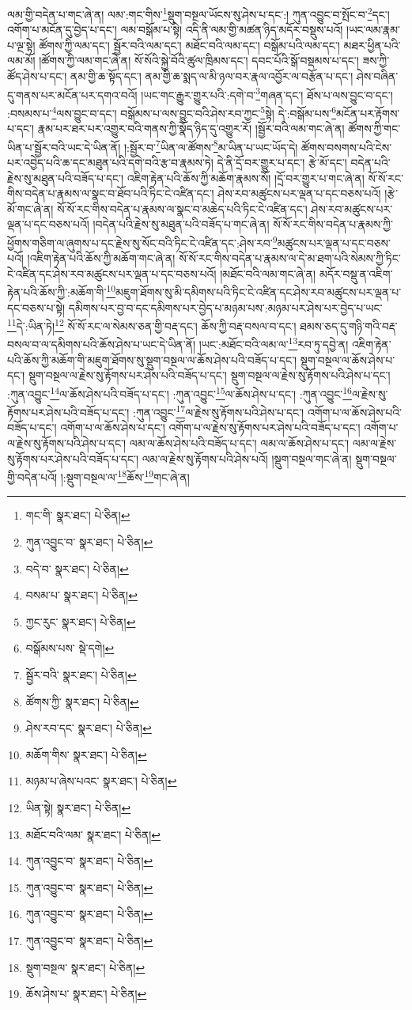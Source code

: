 ལམ་གྱི་བདེན་པ་གང་ཞེ་ན། ལམ་:གང་གིས་\footnote{གང་གི་  སྣར་ཐང་།  པེ་ཅིན། }སྡུག་བསྔལ་ཡོངས་སུ་ཤེས་པ་དང་:། ཀུན་འབྱུང་བ་སྤོང་བ་\footnote{ཀུན་འབྱུང་བ་  སྣར་ཐང་།  པེ་ཅིན། }དང་། འགོག་པ་མངོན་དུ་བྱེད་པ་དང་། ལམ་བསྒོམ་པ་སྟེ། འདི་ནི་ལམ་གྱི་མཚན་ཉིད་མདོར་བསྡུས་པའོ། །ཡང་ལམ་རྣམ་པ་ལྔ་སྟེ། ཚོགས་ཀྱི་ལམ་དང་། སྦྱོར་བའི་ལམ་དང་། མཐོང་བའི་ལམ་དང་། བསྒོམ་པའི་ལམ་དང་། མཐར་ཕྱིན་པའི་ལམ་མོ། །ཚོགས་ཀྱི་ལམ་གང་ཞེ་ན། སོ་སོའི་སྐྱེ་བོའི་ཚུལ་ཁྲིམས་དང་། དབང་པོའི་སྒོ་བསྡམས་པ་དང་། ཟས་ཀྱི་ཚོད་ཤེས་པ་དང་། ནམ་གྱི་ཆ་སྟོད་དང་། ནམ་གྱི་ཆ་སྨད་ལ་མི་ཉལ་བར་རྣལ་འབྱོར་ལ་བརྩོན་པ་དང་། ཤེས་བཞིན་དུ་གནས་པར་མངོན་པར་དགའ་བའོ། །ཡང་གང་རྒྱུར་གྱུར་པའི་:དགེ་བ་\footnote{བདེ་བ་  སྣར་ཐང་།  པེ་ཅིན། }གཞན་དང་། ཐོས་པ་ལས་བྱུང་བ་དང་། :བསམས་པ་\footnote{བསམ་པ་  སྣར་ཐང་།  པེ་ཅིན། }ལས་བྱུང་བ་དང་། བསྒོམས་པ་ལས་བྱུང་བའི་ཤེས་རབ་ཀྱང་\footnote{ཀྱང་རུང་  སྣར་ཐང་།  པེ་ཅིན། }སྟེ། དེ་:བསྒོམ་པས་\footnote{བསྒོམས་པས་  སྡེ་དགེ། }མངོན་པར་རྟོགས་པ་དང་། རྣམ་པར་ཐར་པར་འགྱུར་བའི་གནས་ཀྱི་སྣོད་ཉིད་དུ་འགྱུར་རོ། །སྦྱོར་བའི་ལམ་གང་ཞེ་ན། ཚོགས་ཀྱི་གང་ཡིན་པ་སྦྱོར་བའི་ཡང་དེ་ཡིན་ནོ། །:སྦྱོར་བ་\footnote{སྦྱོར་བའི་  སྣར་ཐང་།  པེ་ཅིན། }ཡིན་ལ་ཚོགས་\footnote{ཚོགས་ཀྱི་  སྣར་ཐང་།  པེ་ཅིན། }མ་ཡིན་པ་ཡང་ཡོད་དེ། ཚོགས་བསགས་པའི་ངེས་པར་འབྱེད་པའི་ཆ་དང་མཐུན་པའི་དགེ་བའི་རྩ་བ་རྣམས་ཏེ། དེ་ནི་དྲོ་བར་གྱུར་པ་དང་། རྩེ་མོ་དང་། བདེན་པའི་རྗེས་སུ་མཐུན་པའི་བཟོད་པ་དང་། འཇིག་རྟེན་པའི་ཆོས་ཀྱི་མཆོག་རྣམས་སོ། །དྲོ་བར་གྱུར་པ་གང་ཞེ་ན། སོ་སོ་རང་གིས་བདེན་པ་རྣམས་ལ་སྣང་བ་ཐོབ་པའི་ཏིང་ངེ་འཛིན་དང་། ཤེས་རབ་མཚུངས་པར་ལྡན་པ་དང་བཅས་པའོ། །རྩེ་མོ་གང་ཞེ་ན། སོ་སོ་རང་གིས་བདེན་པ་རྣམས་ལ་སྣང་བ་མཆེད་པའི་ཏིང་ངེ་འཛིན་དང་། ཤེས་རབ་མཚུངས་པར་ལྡན་པ་དང་བཅས་པའོ། །བདེན་པའི་རྗེས་སུ་མཐུན་པའི་བཟོད་པ་གང་ཞེ་ན། སོ་སོ་རང་གིས་བདེན་པ་རྣམས་ཀྱི་ཕྱོགས་གཅིག་ལ་ཞུགས་པ་དང་རྗེས་སུ་སོང་བའི་ཏིང་ངེ་འཛིན་དང་:ཤེས་རབ་\footnote{ཤེས་རབ་དང་  སྣར་ཐང་།  པེ་ཅིན། }མཚུངས་པར་ལྡན་པ་དང་བཅས་པའོ། །འཇིག་རྟེན་པའི་ཆོས་ཀྱི་མཆོག་གང་ཞེ་ན། སོ་སོ་རང་གིས་བདེན་པ་རྣམས་ལ་དེ་མ་ཐག་པའི་སེམས་ཀྱི་ཏིང་ངེ་འཛིན་དང་ཤེས་རབ་མཚུངས་པར་ལྡན་པ་དང་བཅས་པའོ། །མཐོང་བའི་ལམ་གང་ཞེ་ན། མདོར་བསྡུ་ན་འཇིག་རྟེན་པའི་ཆོས་ཀྱི་:མཆོག་གི་\footnote{མཆོག་གིས་  སྣར་ཐང་།  པེ་ཅིན། }མཇུག་ཐོགས་སུ་མི་དམིགས་པའི་ཏིང་ངེ་འཛིན་དང་ཤེས་རབ་མཚུངས་པར་ལྡན་པ་དང་བཅས་པ་སྟེ། དམིགས་པར་བྱ་བ་དང་དམིགས་པར་བྱེད་པ་མཉམ་པས་:མཉམ་པར་ཤེས་པར་བྱེད་པ་ཡང་\footnote{མཉམ་པ་ཞེས་པའང་  སྣར་ཐང་།  པེ་ཅིན། }དེ་:ཡིན་ཏེ།\footnote{ཡིན་སྟེ།  སྣར་ཐང་།  པེ་ཅིན། } སོ་སོ་རང་ལ་སེམས་ཅན་གྱི་བརྡ་དང་། ཆོས་ཀྱི་བརྡ་བསལ་བ་དང་། ཐམས་ཅད་དུ་གཉི་གའི་བརྡ་བསལ་བ་ལ་དམིགས་པའི་ཆོས་ཤེས་པ་ཡང་དེ་ཡིན་ནོ། །ཡང་:མཐོང་བའི་ལམ་ལ་\footnote{མཐོང་བའི་ལམ་  སྣར་ཐང་།  པེ་ཅིན། }རབ་ཏུ་དབྱེ་ན། འཇིག་རྟེན་པའི་ཆོས་ཀྱི་མཆོག་གི་མཇུག་ཐོགས་སུ་སྡུག་བསྔལ་ལ་ཆོས་ཤེས་པའི་བཟོད་པ་དང་། སྡུག་བསྔལ་ལ་ཆོས་ཤེས་པ་དང་། སྡུག་བསྔལ་ལ་རྗེས་སུ་རྟོགས་པར་ཤེས་པའི་བཟོད་པ་དང་། སྡུག་བསྔལ་ལ་རྗེས་སུ་རྟོགས་པའི་ཤེས་པ་དང་། :ཀུན་འབྱུང་\footnote{ཀུན་འབྱུང་བ་  སྣར་ཐང་།  པེ་ཅིན། }ལ་ཆོས་ཤེས་པའི་བཟོད་པ་དང་། :ཀུན་འབྱུང་\footnote{ཀུན་འབྱུང་བ་  སྣར་ཐང་།  པེ་ཅིན། }ལ་ཆོས་ཤེས་པ་དང་། :ཀུན་འབྱུང་\footnote{ཀུན་འབྱུང་བ་  སྣར་ཐང་།  པེ་ཅིན། }ལ་རྗེས་སུ་རྟོགས་པར་ཤེས་པའི་བཟོད་པ་དང་། :ཀུན་འབྱུང་\footnote{ཀུན་འབྱུང་བ་  སྣར་ཐང་།  པེ་ཅིན། }ལ་རྗེས་སུ་རྟོགས་པའི་ཤེས་པ་དང་། འགོག་པ་ལ་ཆོས་ཤེས་པའི་བཟོད་པ་དང་། འགོག་པ་ལ་ཆོས་ཤེས་པ་དང་། འགོག་པ་ལ་རྗེས་སུ་རྟོགས་པར་ཤེས་པའི་བཟོད་པ་དང་། འགོག་པ་ལ་རྗེས་སུ་རྟོགས་པའི་ཤེས་པ་དང་། ལམ་ལ་ཆོས་ཤེས་པའི་བཟོད་པ་དང་། ལམ་ལ་ཆོས་ཤེས་པ་དང་། ལམ་ལ་རྗེས་སུ་རྟོགས་པར་ཤེས་པའི་བཟོད་པ་དང་། ལམ་ལ་རྗེས་སུ་རྟོགས་པའི་ཤེས་པའོ། །སྡུག་བསྔལ་གང་ཞེ་ན། སྡུག་བསྔལ་གྱི་བདེན་པའོ། །:སྡུག་བསྔལ་ལ་\footnote{སྡུག་བསྔལ་  སྣར་ཐང་།  པེ་ཅིན། }ཆོས་\footnote{ཆོས་ཤེས་པ་  སྣར་ཐང་།  པེ་ཅིན། }གང་ཞེ་ན། 